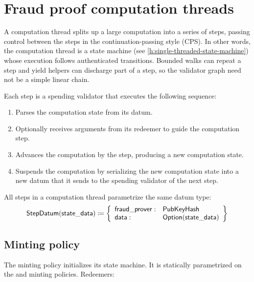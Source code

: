 \documentclass[../midgard.tex]{subfiles}
\begin{document}
\section{Fraud proof computation threads}
\label{h:fraud-proof-computation-threads}

A computation thread splits up a large computation into a series of steps, passing control between the steps in the continuation-passing style (CPS).
In other words, the computation thread is a state machine (see \cref{h:single-threaded-state-machine}) whose execution follows authenticated transitions. Bounded walks can repeat a step and yield helpers can discharge part of a step, so the validator graph need not be a simple linear chain.

Each step is a spending validator that executes the following sequence:
\begin{enumerate}
    \item Parses the computation state from its datum.
    \item Optionally receives arguments from its redeemer to guide the computation step.
    \item Advances the computation by the step, producing a new computation state.
    \item Suspends the computation by serializing the new computation state into a new datum that it sends to the spending validator of the next step.
\end{enumerate}

All steps in a computation thread parametrize the same datum type:
\begin{equation*}
    \mathsf{StepDatum} (\mathsf{state\_data}) \coloneq \left\{
    \begin{array}{ll}
        \mathsf{fraud\_prover}  : & \mathsf{PubKeyHash} \\
        \mathsf{data} : & \mathsf{Option(state\_data)}
    \end{array} \right\}
\end{equation*}

\subsection{Minting policy}
\label{h:fraud-proof-computation-threads-minting-policy}

The  minting policy initializes its state machine.
It is statically parametrized on the  and  minting policies.
Redeemers:
\end{document}
